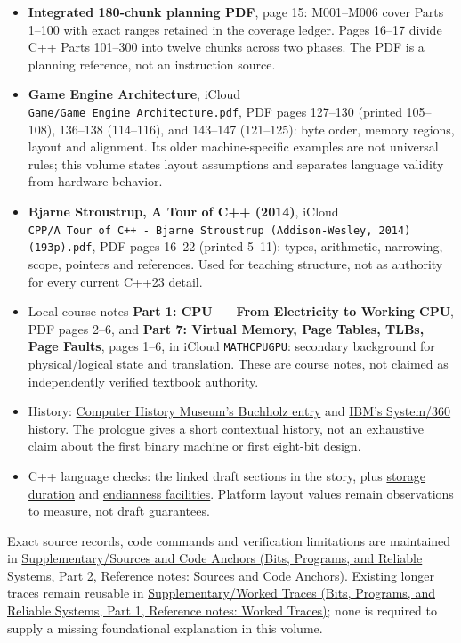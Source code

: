 \begin{itemize}
\tightlist
\item
  \textbf{Integrated 180-chunk planning PDF}, page 15: M001--M006 cover Parts 1--100 with exact ranges retained in the coverage ledger. Pages 16--17 divide C++ Parts 101--300 into twelve chunks across two phases. The PDF is a planning reference, not an instruction source.
\item
  \textbf{Game Engine Architecture}, iCloud \texttt{Game/Game\ Engine\ Architecture.pdf}, PDF pages 127--130 (printed 105--108), 136--138 (114--116), and 143--147 (121--125): byte order, memory regions, layout and alignment. Its older machine-specific examples are not universal rules; this volume states layout assumptions and separates language validity from hardware behavior.
\item
  \textbf{Bjarne Stroustrup, A Tour of C++ (2014)}, iCloud \texttt{CPP/A\ Tour\ of\ C++\ -\ Bjarne\ Stroustrup\ (Addison-Wesley,\ 2014)(193p).pdf}, PDF pages 16--22 (printed 5--11): types, arithmetic, narrowing, scope, pointers and references. Used for teaching structure, not as authority for every current C++23 detail.
\item
  Local course notes \textbf{Part 1: CPU --- From Electricity to Working CPU}, PDF pages 2--6, and \textbf{Part 7: Virtual Memory, Page Tables, TLBs, Page Faults}, pages 1--6, in iCloud \texttt{MATHCPUGPU}: secondary background for physical/logical state and translation. These are course notes, not claimed as independently verified textbook authority.
\item
  History: \href{https://www.computerhistory.org/tdih/october/24/}{Computer History Museum's Buchholz entry} and \href{https://www.ibm.com/history/system-360}{IBM's System/360 history}. The prologue gives a short contextual history, not an exhaustive claim about the first binary machine or first eight-bit design.
\item
  C++ language checks: the linked draft sections in the story, plus \href{https://eel.is/c++draft/basic.stc}{storage duration} and \href{https://eel.is/c++draft/bit.endian}{endianness facilities}. Platform layout values remain observations to measure, not draft guarantees.
\end{itemize}

Exact source records, code commands and verification limitations are maintained in \href{../01-Bits-Programs-and-Reliable-Systems-P02/main.pdf\#nameddest=appendix-a103e7846d21}{Supplementary/Sources and Code Anchors (Bits, Programs, and Reliable Systems, Part 2, Reference notes: Sources and Code Anchors)}. Existing longer traces remain reusable in \href{../01-Bits-Programs-and-Reliable-Systems-P01/main.pdf\#nameddest=appendix-92ff77d4dfdc}{Supplementary/Worked Traces (Bits, Programs, and Reliable Systems, Part 1, Reference notes: Worked Traces)}; none is required to supply a missing foundational explanation in this volume.

